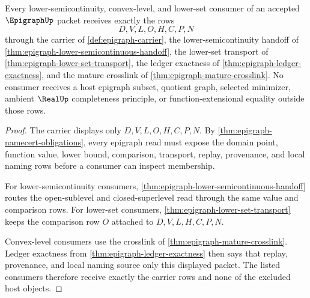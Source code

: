 \begin{theorem}
\label{thm:epigraph-mature-consumer-completeness}
Every lower-semicontinuity, convex-level, and lower-set consumer of an accepted $\EpigraphUp$ packet receives exactly the rows
$$
D,V,L,O,H,C,P,N
$$
through the carrier of \autoref{def:epigraph-carrier}, the lower-semicontinuity handoff of \autoref{thm:epigraph-lower-semicontinuous-handoff}, the lower-set transport of \autoref{thm:epigraph-lower-set-transport}, the ledger exactness of \autoref{thm:epigraph-ledger-exactness}, and the mature crosslink of \autoref{thm:epigraph-mature-crosslink}. No consumer receives a host epigraph subset, quotient graph, selected minimizer, ambient $\RealUp$ completeness principle, or function-extensional equality outside those rows.
\end{theorem}
\begin{proof}
The carrier displays only $D,V,L,O,H,C,P,N$. By \autoref{thm:epigraph-namecert-obligations}, every epigraph read must expose the domain point, function value, lower bound, comparison, transport, replay, provenance, and local naming rows before a consumer can inspect membership.

For lower-semicontinuity consumers, \autoref{thm:epigraph-lower-semicontinuous-handoff} routes the open-sublevel and closed-superlevel read through the same value and comparison rows. For lower-set consumers, \autoref{thm:epigraph-lower-set-transport} keeps the comparison row $O$ attached to $D,V,L,H,C,P,N$.

Convex-level consumers use the crosslink of \autoref{thm:epigraph-mature-crosslink}. Ledger exactness from \autoref{thm:epigraph-ledger-exactness} then says that replay, provenance, and local naming source only this displayed packet. The listed consumers therefore receive exactly the carrier rows and none of the excluded host objects.
\end{proof}



